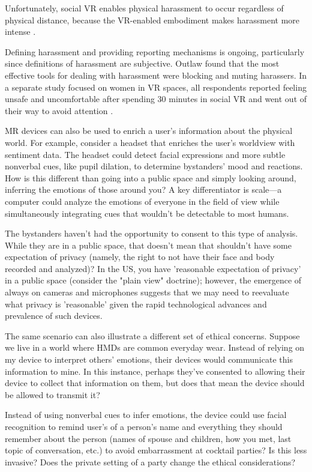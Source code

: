 Unfortunately, social VR enables physical harassment to occur regardless of physical distance, because the VR-enabled embodiment  makes harassment more intense \cite{blackwell}.

Defining harassment and providing reporting mechanisms is ongoing, particularly since definitions of harassment are subjective. Outlaw found that the most effective tools for dealing with harassment were blocking and muting harassers. In a separate study focused on women in VR spaces, all respondents reported feeling unsafe and uncomfortable after spending 30 minutes in social VR and went out of their way to avoid attention \cite{outlaw2017}.

MR devices can also be used to enrich a user's information about the physical world. For example, consider a headset that enriches the user's worldview with sentiment data. The headset could detect facial expressions and more subtle nonverbal cues, like pupil dilation, to determine bystanders' mood and reactions. How is this different than going into a public space and simply looking around, inferring the emotions of those around you? A key differentiator is scale---a computer could analyze the emotions of everyone in the field of view while simultaneously integrating cues that wouldn't be detectable to most humans.

The bystanders haven't had the opportunity to consent to this type of analysis. While they are in a public space, that doesn't mean that shouldn't have some expectation of privacy (namely, the right to not have their face and body recorded and analyzed)? In the US, you have 'reasonable expectation of privacy' in a public space (consider the "plain view" doctrine); however, the emergence of always on cameras and microphones suggests that we may need to reevaluate what privacy is 'reasonable' given the rapid technological advances and prevalence of such devices.

The same scenario can also illustrate a different set of ethical concerns. Suppose we live in a world where HMDs are common everyday wear. Instead of relying on my device to interpret others' emotions, their devices would communicate this information to mine. In this instance, perhaps they've consented to allowing their device to collect that information on them, but does that mean the device should be allowed to transmit it?

Instead of using nonverbal cues to infer emotions, the device could use facial recognition to remind user's of a person's name and everything they should remember about the person (names of spouse and children, how you met, last topic of conversation, etc.) to avoid embarrassment at cocktail parties\cite{wassom2014augmented}? Is this less invasive? Does the private setting of a party change the ethical considerations?

